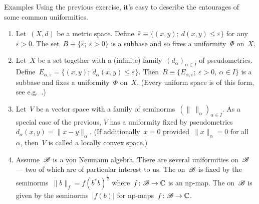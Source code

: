 \documentclass[b]{subfiles}
\begin{document}
\begin{parsec}
\begin{point}{Examples}
Using the previous exercise, it's easy
to describe the entourages of some common uniformities.
    \begin{enumerate}
        \item
    Let~$(X,d)$ be a metric space.
Define~$\hat\varepsilon \equiv \{(x,y);\ d(x,y) \leq \varepsilon\}$
for any $\varepsilon > 0$.
The set~$B \equiv \{ \hat\varepsilon; \ \varepsilon > 0\}$
is a subbase and so fixes a uniformity~$\Phi$ on~$X$.
        \item
    Let~$X$ be a set together with a (infinite)
            family~$(d_{\alpha})_{\alpha\in I}$
        of pseudometrics.
    Define~$E_{\alpha,\varepsilon} = \{ (x,y); \ d_\alpha(x,y)
            \leq \varepsilon\}$.
            Then~$B \equiv \{ E_{\alpha,\varepsilon}; \ \varepsilon > 0, \ 
                    \alpha \in I\}$
                    is a subbase and fixes
                    a uniformity~$\Phi$ on~$X$.
(Every uniform space is of this form, see e.g.~\cite[Thm.~39.11]{willard}.)
\item
Let~$V$ be a vector space with a
family of seminorms~$(\|\  \|_\alpha)_{\alpha \in I}$.
As a special case of the previous,
 $V$ has a uniformity fixed by
    pseudometrics~$d_\alpha(x,y) = \|x-y\|_\alpha$.
    (If additionally~$x =0$ provided~$\|x\|_\alpha = 0$ for all~$\alpha$,
    then~$V$ is called a locally convex space.)

\item
Assume~$\mathscr{B}$ is a von Neumann algebra.
There are several uniformities on~$\mathscr{B}$ --- two of which
    are of particular interest to us.
The  on~$\mathscr{B}$
is fixed by the seminorms~$\|b\|_f = f(b^*b)^{\frac{1}{2}}$
        where~$f\colon \mathscr{B} \to \mathbb{C}$ is an np-map.
The  on~$\mathscr{B}$
    is given by the seminorms~$|f(b)|$
        for np-maps~$f\colon \mathscr{B} \to \mathbb{C}$.


\end{enumerate}
\end{point}
\end{parsec}
\end{document}

